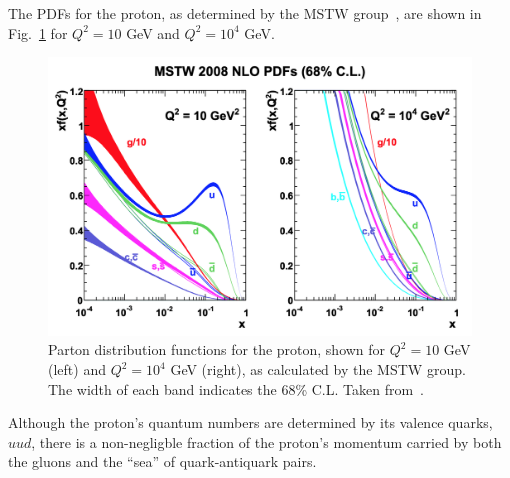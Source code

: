The PDFs for the proton, as determined by the MSTW group~\cite{Martin:2009iq}, are shown in Fig.~\ref{fig:pp_nlo_pdfs} for $Q^2 = 10$ GeV and $Q^2 = 10^4$ GeV.
\begin{figure} [htbp!]
    \centering
    \includegraphics[width=\linewidth]{figures/physics_of_pp/pp_nlo_pdfs.png}
    \caption{Parton distribution functions for the proton, shown for $Q^2 = 10$ GeV (left) and $Q^2 = 10^4$ GeV (right), as calculated by the MSTW group. The width of each band indicates the 68\% C.L. Taken from~\cite{Martin:2009iq}.}
    \label{fig:pp_nlo_pdfs}
\end{figure}
Although the proton's quantum numbers are determined by its valence quarks, $uud$, there is a non-negligble fraction of the proton's momentum carried by both the gluons and the ``sea'' of quark-antiquark pairs.
